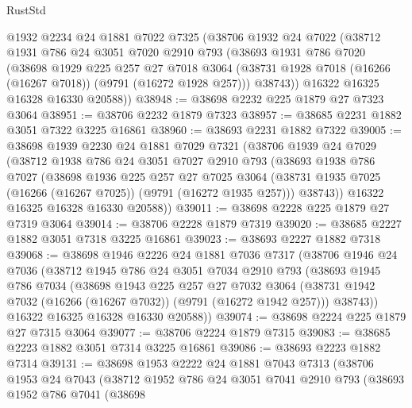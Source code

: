 \begin{lexlean}{RustStd}
\begin{coremodule}
    @1932
    @2234
    @24
    @1881
    @7022
    @7325
    (@38706
      @1932
      @24
      @7022
      (@38712
        @1931
        @786
        @24
        @3051
        @7020
        @2910
        @793
        (@38693
          @1931
          @786
          @7020
          (@38698
            @1929
            @225
            @257
            @27
            @7018
            @3064
            (@38731 @1928 @7018 (@16266 (@16267 @7018)) (@9791 (@16272 @1928 @257)))
            @38743))
        @16322
        @16325
        @16328
        @16330
        @20588))
@38948 := @38698 @2232 @225 @1879 @27 @7323 @3064
@38951 := @38706 @2232 @1879 @7323
@38957 := @38685 @2231 @1882 @3051 @7322 @3225 @16861
@38960 := @38693 @2231 @1882 @7322
@39005 := @38698
    @1939
    @2230
    @24
    @1881
    @7029
    @7321
    (@38706
      @1939
      @24
      @7029
      (@38712
        @1938
        @786
        @24
        @3051
        @7027
        @2910
        @793
        (@38693
          @1938
          @786
          @7027
          (@38698
            @1936
            @225
            @257
            @27
            @7025
            @3064
            (@38731 @1935 @7025 (@16266 (@16267 @7025)) (@9791 (@16272 @1935 @257)))
            @38743))
        @16322
        @16325
        @16328
        @16330
        @20588))
@39011 := @38698 @2228 @225 @1879 @27 @7319 @3064
@39014 := @38706 @2228 @1879 @7319
@39020 := @38685 @2227 @1882 @3051 @7318 @3225 @16861
@39023 := @38693 @2227 @1882 @7318
@39068 := @38698
    @1946
    @2226
    @24
    @1881
    @7036
    @7317
    (@38706
      @1946
      @24
      @7036
      (@38712
        @1945
        @786
        @24
        @3051
        @7034
        @2910
        @793
        (@38693
          @1945
          @786
          @7034
          (@38698
            @1943
            @225
            @257
            @27
            @7032
            @3064
            (@38731 @1942 @7032 (@16266 (@16267 @7032)) (@9791 (@16272 @1942 @257)))
            @38743))
        @16322
        @16325
        @16328
        @16330
        @20588))
@39074 := @38698 @2224 @225 @1879 @27 @7315 @3064
@39077 := @38706 @2224 @1879 @7315
@39083 := @38685 @2223 @1882 @3051 @7314 @3225 @16861
@39086 := @38693 @2223 @1882 @7314
@39131 := @38698
    @1953
    @2222
    @24
    @1881
    @7043
    @7313
    (@38706
      @1953
      @24
      @7043
      (@38712
        @1952
        @786
        @24
        @3051
        @7041
        @2910
        @793
        (@38693
          @1952
          @786
          @7041
          (@38698

\end{coremodule}
\end{lexlean}

